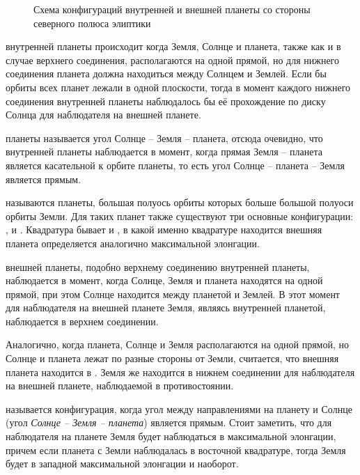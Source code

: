 \begin{wrapfigure}[20]{r}{0.65\tw}
    \caption{Схема конфигураций внутренней и внешней планеты со стороны северного полюса элиптики}
\end{wrapfigure}
 внутренней планеты происходит когда Земля, Солнце и планета, также как и в случае верхнего соединения, располагаются на одной прямой, но для нижнего соединения планета должна находиться между Солнцем и Землей. Если бы орбиты всех планет лежали в одной плоскости, тогда в момент каждого нижнего соединения внутренней планеты наблюдалось бы её прохождение по диску Солнца для наблюдателя на внешней планете.

 планеты называется угол Солнце -- Земля -- планета, отсюда очевидно, что  внутренней планеты наблюдается в момент, когда прямая Земля -- планета является касательной к орбите планеты, то есть угол Солнце -- планета -- Земля является прямым.

 называются планеты, большая полуось орбиты которых больше большой полуоси орбиты Земли. Для таких планет также существуют три основные конфигурации: ,  и . Квадратура бывает  и , в какой именно квадратуре находится внешняя планета определяется аналогично максимальной элонгации.

 внешней планеты, подобно верхнему соединению внутренней планеты, наблюдается в момент, когда Солнце, Земля и планета находятся на одной прямой, при этом Солнце находится между планетой и Землей. В этот момент для наблюдателя на внешней планете Земля, являясь внутренней планетой, наблюдается в верхнем соединении.

Аналогично, когда планета, Солнце и Земля располагаются на одной прямой, но Солнце и планета лежат по разные стороны от Земли, считается, что внешняя планета находится в . Земля же находится в нижнем соединении для наблюдателя на внешней планете, наблюдаемой в противостоянии.

 называется конфигурация, когда угол между направлениями на планету и Солнце (угол {\slshape Солнце -- Земля -- планета}) является прямым. Стоит заметить, что для наблюдателя на планете Земля будет наблюдаться в максимальной элонгации, причем если планета с Земли наблюдалась в восточной квадратуре, тогда Земля будет в западной максимальной элонгации и наоборот.

